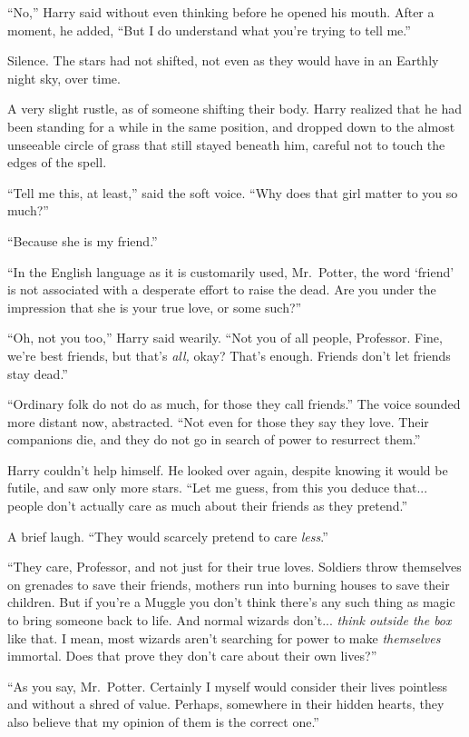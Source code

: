 “No,” Harry said without even thinking before he opened his mouth. After a moment, he added, “But I do understand what you’re trying to tell me.”

Silence. The stars had not shifted, not even as they would have in an Earthly night sky, over time.

A very slight rustle, as of someone shifting their body. Harry realized that he had been standing for a while in the same position, and dropped down to the almost unseeable circle of grass that still stayed beneath him, careful not to touch the edges of the spell.

“Tell me this, at least,” said the soft voice. “Why does that girl matter to you so much?”

“Because she is my friend.”

“In the English language as it is customarily used, Mr.~Potter, the word ‘friend’ is not associated with a desperate effort to raise the dead. Are you under the impression that she is your true love, or some such?”

“Oh, not you too,” Harry said wearily. “Not you of all people, Professor. Fine, we’re best friends, but that’s \emph{all,} okay? That’s enough. Friends don’t let friends stay dead.”

“Ordinary folk do not do as much, for those they call friends.” The voice sounded more distant now, abstracted. “Not even for those they say they love. Their companions die, and they do not go in search of power to resurrect them.”

Harry couldn’t help himself. He looked over again, despite knowing it would be futile, and saw only more stars. “Let me guess, from this you deduce that... people don’t actually care as much about their friends as they pretend.”

A brief laugh. “They would scarcely pretend to care \emph{less}.”

“They care, Professor, and not just for their true loves. Soldiers throw themselves on grenades to save their friends, mothers run into burning houses to save their children. But if you’re a Muggle you don’t think there’s any such thing as magic to bring someone back to life. And normal wizards don’t... \emph{think outside the box} like that. I mean, most wizards aren’t searching for power to make \emph{themselves} immortal. Does that prove they don’t care about their own lives?”

“As you say, Mr.~Potter. Certainly I myself would consider their lives pointless and without a shred of value. Perhaps, somewhere in their hidden hearts, they also believe that my opinion of them is the correct one.”

